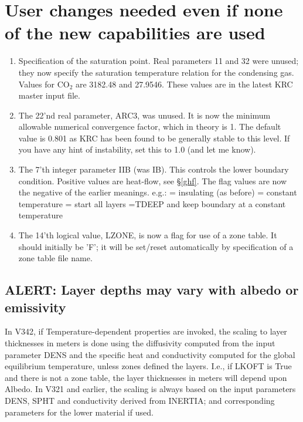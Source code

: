\documentclass{article}
\begin{document}
\section {User changes needed even if none of the new capabilities are used \label{need}}
\begin{enumerate}    %

\item Specification of the saturation point. Real parameters 11 and 32 were
  unused; they now specify the saturation temperature relation for the
  condensing gas. Values for CO$_2$ are 3182.48 and 27.9546. These values are in
  the latest KRC master input file.

\item The 22'nd real parameter, ARC3, was unused. It is now the minimum
  allowable numerical convergence factor, which in theory is 1. The default
  value is 0.801 as KRC has been found to be generally stable to this level. If
  you have any hint of instability, set this to 1.0 (and let me know).

 \item The 7'th integer parameter IIB (was IB). This controls the lower boundary
   condition. Positive values are heat-flow, see \S \ref{ghf}. The flag values
   are now the negative of the earlier meanings. e.g.:
 = insulating (as before)
 = constant temperature 
 = start all layers =TDEEP and keep boundary at a constant temperature 

\item The 14'th logical value, LZONE, is now a flag for use of a zone table. It
  should initially be 'F'; it will be set/reset automatically by specification
  of a zone table file name.

\end{enumerate}

\subsection{ALERT: Layer depths may vary with albedo or emissivity}

In V342, if Temperature-dependent properties are invoked, the scaling to
layer thicknesses in meters is done using the diffusivity computed from the input parameter DENS and the specific
heat and conductivity computed for the global equilibrium temperature, unless
zones defined the layers.  I.e., if LKOFT is True and there is not a zone table,
the layer thicknesses in meters will depend upon Albedo. In V321 and earlier, the
scaling is always based on the input parameters DENS, SPHT and conductivity
derived from INERTIA; and corresponding parameters for the lower material if
used.
\end{document}
